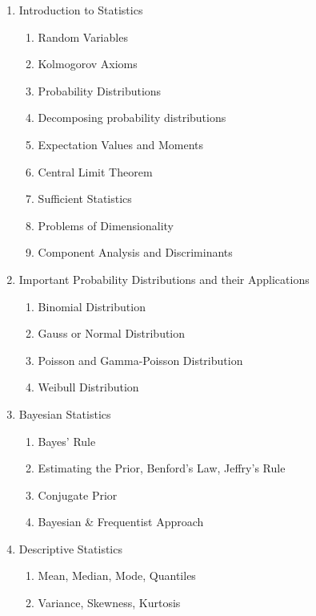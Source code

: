 \documentclass[8pt]{extarticle}
\begin{document}
\begin{enumerate}
    \item Introduction to Statistics
          \begin{enumerate}[label*=\arabic*.]
              \item Random Variables
              \item Kolmogorov Axioms
              \item Probability Distributions
              \item Decomposing probability distributions
              \item Expectation Values and Moments
              \item Central Limit Theorem
              \item Sufficient Statistics
              \item Problems of Dimensionality
              \item Component Analysis and Discriminants
          \end{enumerate}
    \item Important Probability Distributions and their Applications
          \begin{enumerate}[label*=\arabic*.]
              \item Binomial Distribution
              \item Gauss or Normal Distribution
              \item Poisson and Gamma-Poisson Distribution
              \item Weibull Distribution
          \end{enumerate}
    \item Bayesian Statistics
          \begin{enumerate}[label*=\arabic*.]
              \item Bayes’ Rule
              \item Estimating the Prior, Benford’s Law, Jeffry’s Rule
              \item Conjugate Prior
              \item Bayesian \& Frequentist Approach
          \end{enumerate}
    \item Descriptive Statistics
          \begin{enumerate}[label*=\arabic*.]
              \item Mean, Median, Mode, Quantiles
              \item Variance, Skewness, Kurtosis
          \end{enumerate}

\end{enumerate}
\end{document}
